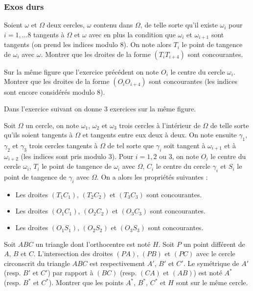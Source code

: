 \subsubsection{Exos durs}

\begin{exo}
Soient $\omega$ et $\Omega$ deux cercles, $\omega$ contenu dans $\Omega$, de telle sorte qu'il existe $\omega_i$ pour $i=1,\ldots 8$ tangents à $\Omega$ et $\omega$ avec en plus la condition que $\omega_i$ et $\omega_{i+1}$ sont tangents (on prend les indices modulo 8). On note alors $T_i$ le point de tangence de $\omega_i$ avec $\omega$. Montrer que les droites de la forme $(T_iT_{i+4})$ sont concourantes.
\end{exo}

\begin{exo}
Sur la même figure que l'exercice précédent on note $O_i$ le centre du cercle $\omega_i$. Montrer que les droites de la forme $(O_iO_{i+4})$ sont concourantes (les indices sont encore considérés modulo 8).
\end{exo}

Dans l'exercice suivant on donne 3 exercices sur la même figure.

\begin{exo}
Soit $\Omega$ un cercle, on note $\omega_1$, $\omega_2$ et $\omega_3$ trois cercles à l'intérieur de $\Omega$ de telle sorte qu'ils soient tangents à $\Omega$ et tangents entre eux deux à deux. On note ensuite $\gamma_1$, $\gamma_2$ et $\gamma_3$ trois cercles tangents à $\Omega$ de tel sorte que $\gamma_i$ soit tangent à $\omega_{i+1}$ et à $\omega_{i+2}$ (les indices sont pris modulo 3). Pour $i=1,2$ ou $3$, on note $O_i$ le centre du cercle $\omega_i$, $T_i$ le point de tangence de $\omega_i$ avec $\Omega$, $C_i$ le centre du cercle $\gamma_i$ et $S_i$ le point de tangence de $\gamma_i$ avec $\Omega$. On a alors les propriétés suivantes :

\begin{itemize}
\item Les droites $(T_1C_1)$, $(T_2C_2)$ et $(T_3C_3)$ sont concourantes.
\item Les droites $(O_1C_1)$, $(O_2C_2)$ et $(O_3C_3)$ sont concourantes.
\item Les droites $(O_1S_1)$, $(O_2S_2)$ et $(O_3S_3)$ sont concourantes.
\end{itemize}
\end{exo}

\begin{exo}
Soit $ABC$ un triangle dont l'orthocentre est noté $H$. Soit $P$ un point différent de $A$, $B$ et $C$. L'intersection des droites $(PA)$, $(PB)$ et $(PC)$ avec le cercle circonscrit du triangle $ABC$ est respectivement $A'$, $B'$ et $C'$. Le symétrique de $A'$ (resp. $B'$ et $C'$) par rapport à $(BC)$ (resp. $(CA)$ et $(AB)$) est noté $A^*$ (resp. $B^*$ et $C^*$). Montrer que les points $A^*$, $B^*$, $C^*$ et $H$ sont sur le même cercle.
\end{exo}

